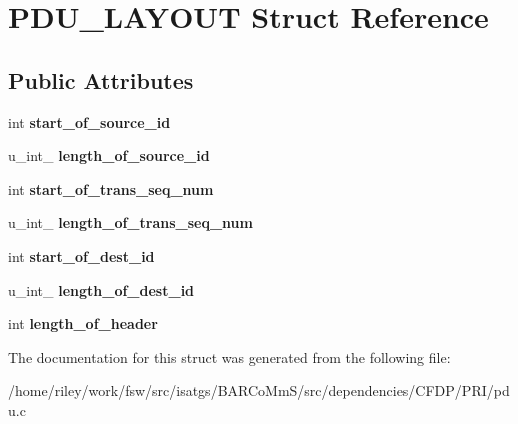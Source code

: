 \hypertarget{struct_p_d_u___l_a_y_o_u_t}{}\section{P\+D\+U\+\_\+\+L\+A\+Y\+O\+UT Struct Reference}
\label{struct_p_d_u___l_a_y_o_u_t}
\subsection*{Public Attributes}
\begin{DoxyCompactItemize}
\item 
int {\bfseries start\+\_\+of\+\_\+source\+\_\+id}\hypertarget{struct_p_d_u___l_a_y_o_u_t_a043cb581971314420aa4e56f28caf3c0}{}\label{struct_p_d_u___l_a_y_o_u_t_a043cb581971314420aa4e56f28caf3c0}

\item 
u\+\_\+int\+\_ {\bfseries length\+\_\+of\+\_\+source\+\_\+id}\hypertarget{struct_p_d_u___l_a_y_o_u_t_af8e6be27a8f640bb5375bc5309990981}{}\label{struct_p_d_u___l_a_y_o_u_t_af8e6be27a8f640bb5375bc5309990981}

\item 
int {\bfseries start\+\_\+of\+\_\+trans\+\_\+seq\+\_\+num}\hypertarget{struct_p_d_u___l_a_y_o_u_t_a2a2e3ff07e91173db7fb6235ea71d04c}{}\label{struct_p_d_u___l_a_y_o_u_t_a2a2e3ff07e91173db7fb6235ea71d04c}

\item 
u\+\_\+int\+\_ {\bfseries length\+\_\+of\+\_\+trans\+\_\+seq\+\_\+num}\hypertarget{struct_p_d_u___l_a_y_o_u_t_a6b7363e84bc3da85a9f2b950dc0b578b}{}\label{struct_p_d_u___l_a_y_o_u_t_a6b7363e84bc3da85a9f2b950dc0b578b}

\item 
int {\bfseries start\+\_\+of\+\_\+dest\+\_\+id}\hypertarget{struct_p_d_u___l_a_y_o_u_t_a6a72eceded37c912aa93dd01c45ebf36}{}\label{struct_p_d_u___l_a_y_o_u_t_a6a72eceded37c912aa93dd01c45ebf36}

\item 
u\+\_\+int\+\_ {\bfseries length\+\_\+of\+\_\+dest\+\_\+id}\hypertarget{struct_p_d_u___l_a_y_o_u_t_a93cc676237ae77ad7cf7a126a01634a5}{}\label{struct_p_d_u___l_a_y_o_u_t_a93cc676237ae77ad7cf7a126a01634a5}

\item 
int {\bfseries length\+\_\+of\+\_\+header}\hypertarget{struct_p_d_u___l_a_y_o_u_t_a7c0d51316eb33fe724bfd0f296d1f736}{}\label{struct_p_d_u___l_a_y_o_u_t_a7c0d51316eb33fe724bfd0f296d1f736}

\end{DoxyCompactItemize}


The documentation for this struct was generated from the following file\+:\begin{DoxyCompactItemize}
\item 
/home/riley/work/fsw/src/isatgs/\+B\+A\+R\+Co\+Mm\+S/src/dependencies/\+C\+F\+D\+P/\+P\+R\+I/pdu.\+c\end{DoxyCompactItemize}
